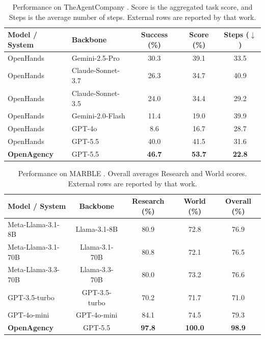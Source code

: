 \documentclass{article} %
\begin{document}
\begin{table}[t]
\caption{Performance on TheAgentCompany \citep{xu2024theagentcompany}. Score is the aggregated task score, and Steps is the average number of steps. External rows are reported by that work.}
\label{tab:tac}
\begin{center}
\small
\setlength{\tabcolsep}{5pt}
\begin{tabular}{llccc}
\toprule
\textbf{Model / System} & \textbf{Backbone} & \textbf{Success (\%)} & \textbf{Score (\%)} & \textbf{Steps ($\downarrow$)} \\
\midrule
OpenHands & Gemini-2.5-Pro & 30.3 & 39.1 & 33.5 \\
OpenHands & Claude-Sonnet-3.7 & 26.3 & 34.7 & 40.9 \\
OpenHands & Claude-Sonnet-3.5 & 24.0 & 34.4 & 29.2 \\
OpenHands & Gemini-2.0-Flash & 11.4 & 19.0 & 39.9 \\
OpenHands & GPT-4o & 8.6 & 16.7 & 28.7 \\
\midrule
OpenHands & GPT-5.5 & 40.0 & 41.5 & 31.6 \\
\rowcolor{gray!12}
\textbf{OpenAgency} & GPT-5.5 & \textbf{46.7} & \textbf{53.7} & \textbf{22.8} \\
\bottomrule
\end{tabular}
\end{center}
\end{table}

\begin{table}[t]
\caption{Performance on MARBLE \citep{zhu2025marble}. Overall averages Research and World scores. External rows are reported by that work.}
\label{tab:marble}
\begin{center}
\small
\setlength{\tabcolsep}{3pt}
\begin{tabular}{lcccc}
\toprule
\textbf{Model / System} & \textbf{Backbone} & \textbf{Research (\%)} & \textbf{World (\%)} & \textbf{Overall (\%)} \\
\midrule
Meta-Llama-3.1-8B      & Llama-3.1-8B  & 80.9 & 72.8 & 76.9 \\
Meta-Llama-3.1-70B     & Llama-3.1-70B & 80.8 & 72.1 & 76.5 \\
Meta-Llama-3.3-70B     & Llama-3.3-70B & 80.0 & 73.2 & 76.6 \\
GPT-3.5-turbo          & GPT-3.5-turbo & 70.2 & 71.7 & 71.0 \\
GPT-4o-mini & GPT-4o-mini   & 84.1 & 74.5 & 79.3 \\
\midrule
\rowcolor{gray!12}
\textbf{OpenAgency}                     & GPT-5.5       & \textbf{97.8} & \textbf{100.0} & \textbf{98.9} \\
\bottomrule
\end{tabular}
\end{center}
\end{table}
\end{document}
